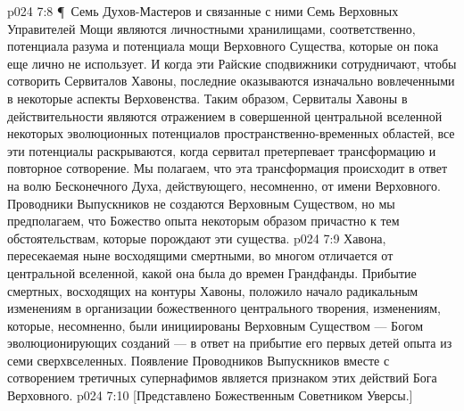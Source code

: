 \vs p024 7:8 \P\ Семь Духов\hyp{}Мастеров и связанные с ними Семь Верховных Управителей Мощи являются личностными хранилищами, соответственно, потенциала разума и потенциала мощи Верховного Существа, которые он пока еще лично не использует. И когда эти Райские сподвижники сотрудничают, чтобы сотворить Сервиталов Хавоны, последние оказываются изначально вовлеченными в некоторые аспекты Верховенства. Таким образом, Сервиталы Хавоны в действительности являются отражением в совершенной центральной вселенной некоторых эволюционных потенциалов пространственно\hyp{}временных областей, все эти потенциалы раскрываются, когда сервитал претерпевает трансформацию и повторное сотворение. Мы полагаем, что эта трансформация происходит в ответ на волю Бесконечного Духа, действующего, несомненно, от имени Верховного. Проводники Выпускников не создаются Верховным Существом, но мы предполагаем, что Божество опыта некоторым образом причастно к тем обстоятельствам, которые порождают эти существа.
\vs p024 7:9 Хавона, пересекаемая ныне восходящими смертными, во многом отличается от центральной вселенной, какой она была до времен Грандфанды. Прибытие смертных, восходящих на контуры Хавоны, положило начало радикальным изменениям в организации божественного центрального творения, изменениям, которые, несомненно, были инициированы Верховным Существом --- Богом эволюционирующих созданий --- в ответ на прибытие его первых детей опыта из семи сверхвселенных. Появление Проводников Выпускников вместе с сотворением третичных супернафимов является признаком этих действий Бога Верховного.
\vs p024 7:10 [Представлено Божественным Советником Уверсы.]
